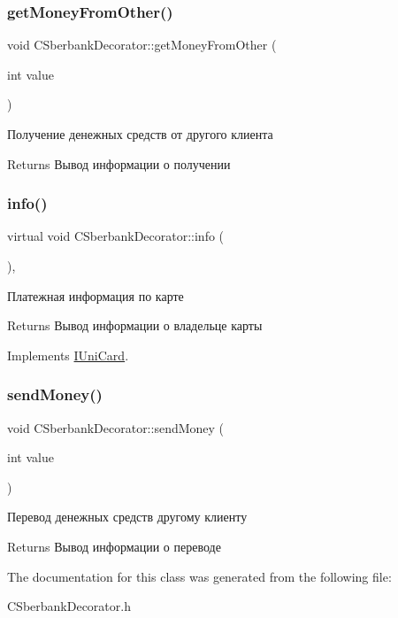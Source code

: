 \subsubsection{\texorpdfstring{get\+Money\+From\+Other()}{getMoneyFromOther()}}
{\footnotesize\ttfamily void C\+Sberbank\+Decorator\+::get\+Money\+From\+Other (\begin{DoxyParamCaption}\item[{int}]{value }\end{DoxyParamCaption})\hspace{0.3cm}{\ttfamily [inline]}}



Получение денежных средств от другого клиента 

\begin{DoxyReturn}{Returns}
Вывод информации о получении 
\end{DoxyReturn}
\mbox{\label{classCSberbankDecorator_a2c19e1fe10123e813de29572512d69b8}} 
\subsubsection{\texorpdfstring{info()}{info()}}
{\footnotesize\ttfamily virtual void C\+Sberbank\+Decorator\+::info (\begin{DoxyParamCaption}{ }\end{DoxyParamCaption})\hspace{0.3cm}{\ttfamily [inline]}, {\ttfamily [virtual]}}



Платежная информация по карте 

\begin{DoxyReturn}{Returns}
Вывод информации о владельце карты 
\end{DoxyReturn}


Implements \hyperlink{classIUniCard}{I\+Uni\+Card}.

\mbox{\label{classCSberbankDecorator_a6c8175379ec2e07e6b4fe6fe2da58425}} 
\subsubsection{\texorpdfstring{send\+Money()}{sendMoney()}}
{\footnotesize\ttfamily void C\+Sberbank\+Decorator\+::send\+Money (\begin{DoxyParamCaption}\item[{int}]{value }\end{DoxyParamCaption})\hspace{0.3cm}{\ttfamily [inline]}}



Перевод денежных средств другому клиенту 

\begin{DoxyReturn}{Returns}
Вывод информации о переводе 
\end{DoxyReturn}


The documentation for this class was generated from the following file\+:\begin{DoxyCompactItemize}
\item 
C\+Sberbank\+Decorator.\+h\end{DoxyCompactItemize}
